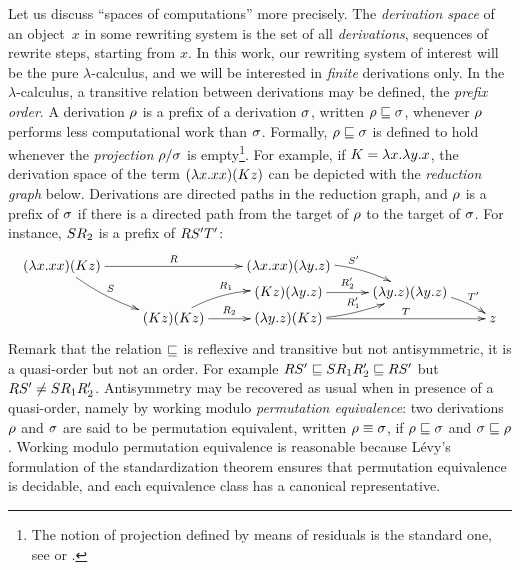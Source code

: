Let us discuss ``spaces of computations'' more precisely.
The \emph{derivation space} of an object~$x$ in some rewriting system
is the set of all {\em derivations}, \ie sequences of rewrite steps, starting from $x$.
In this work, our rewriting system of interest will be the pure $\lambda$-calculus,
and we will be interested in \emph{finite} derivations only.
In the $\lambda$-calculus,
a transitive relation between derivations may be defined, the {\em prefix order}.
A derivation $\rho$ is a prefix of a derivation $\sigma$,
written $\rho \sqsubseteq \sigma$,
whenever $\rho$ performs less computational work than $\sigma$.
Formally, $\rho \sqsubseteq \sigma$ is defined to hold whenever the {\em projection} $\rho/\sigma$ 
is empty\footnote{The notion of projection defined by means of residuals
is the standard one, see \eg \cite[Chapter~12]{Barendregt:1984}
or \cite[Section~8.7]{Terese}.}.
For example, if $K = \lambda x. \lambda y. x$,
the derivation space of the term $(\lambda x. xx)(Kz)$
can be depicted with the \emph{reduction graph} below.
Derivations are directed paths in the reduction graph,
and $\rho$ is a prefix of $\sigma$ if there is a directed path from the
target of $\rho$ to the target of $\sigma$.
For instance, $SR_2$ is a prefix of $RS'T'$:
\[
  \xymatrix@R=.1cm{
    (\lam{\var}{\var\var})(K\varthree)
      \ar^-{\redex}[rr]
      \ar@/_.2cm/^-{\redextwo}[rdd]
  &
  &
    (\lam{\var}{\var\var})(\lam{\vartwo}{\varthree})
    \ar@/^.3cm/[rd]^{\redextwo'}
  &
  \\
  &
  &
    (K\varthree)(\lam{\vartwo}{\varthree}) \ar[r]^-{\redex'_2}
  &
    (\lam{\vartwo}{\varthree})(\lam{\vartwo}{\varthree})
    \ar@/^.2cm/[rd]^-{\redexthree'}
  \\
  &
    (K\varthree)(K\varthree) \ar@/^.3cm/[ru]^{\redex_1} \ar[r]^-{\redex_2}
  &
    (\lam{\vartwo}{\varthree})(K\varthree)
      \ar@/_.2cm/[ru]^-{\redex'_1}
      \ar[rr]^-{\redexthree}
  &
  &
    \varthree
  }
\]
Remark that the relation $\sqsubseteq$ is reflexive and transitive but not antisymmetric,
\ie it is a quasi-order but not an order.
For example $RS' \sqsubseteq SR_1R_2' \sqsubseteq RS'$
but $RS' \neq  SR_1R_2'$.
Antisymmetry may be recovered as usual when in presence of a quasi-order,
namely by working modulo {\em permutation equivalence}:
two derivations $\rho$ and $\sigma$
are said to be permutation equivalent,
written $\rho \equiv \sigma$, if $\rho \sqsubseteq \sigma$
and $\sigma \sqsubseteq \rho$.
Working modulo permutation equivalence is reasonable because L\'evy's formulation
of the standardization theorem ensures that permutation equivalence is decidable,
and each equivalence class has a canonical representative.

